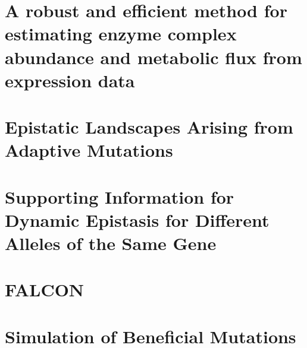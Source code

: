 \documentclass[phd,tocprelim]{cornell}
\newcommand*{\commonDir}{./common/}    %
\begin{document}
\chapter{A robust and efficient method for
estimating enzyme complex abundance
and metabolic flux from expression data}
\label{chap:FALCON}

\falconAbstractMotivation \falconAbstractResults \falconAbstractAvail
\pagebreak


\chapter{Epistatic Landscapes Arising from Adaptive Mutations}
\epiBeneMutAbstract


\appendix

\chapter{Supporting Information for
Dynamic Epistasis for Different Alleles of the Same Gene}


\chapter{FALCON}



\chapter{Simulation of Beneficial Mutations}



\end{document}
